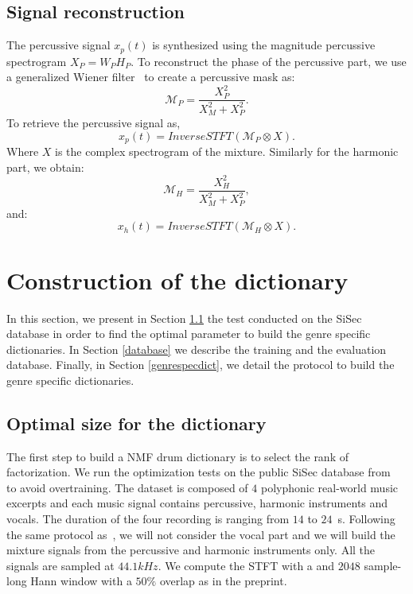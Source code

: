 \documentclass{article}
\begin{document}
 
\subsection{Signal reconstruction}

The percussive signal $x_p(t)$ is synthesized using the magnitude percussive spectrogram $X_P = W_PH_P$. To reconstruct the phase of the percussive part, we use a generalized Wiener filter~\cite{liutkus2015generalized} to create a percussive mask as:
\begin{equation}
\mathcal{M}_P = \frac{X_P^2}{X_M^2 + X_P^2}.
\end{equation} 
To retrieve the percussive signal as, 
\begin{equation}
x_p(t) = InverseSTFT(\mathcal{M}_P \otimes X).
\end{equation}
Where $X$ is the complex spectrogram of the mixture.
Similarly for the harmonic part, we obtain:
\begin{equation}\label{percuweiner}
\mathcal{M}_H = \frac{X_H^2}{X_M^2 + X_P^2},
\end{equation}
and:
\begin{equation}
x_h(t) = InverseSTFT(\mathcal{M}_H \otimes X).
\end{equation}




\section{Construction of the dictionary}

In this section, we present in Section \ref{optimalsize} the test conducted on the SiSec database in order to find the optimal parameter to build the genre specific dictionaries. In Section \ref{database} we describe the training and the evaluation database. Finally, in Section \ref{genrespecdict}, we detail the protocol to build the genre specific dictionaries. 

\subsection{Optimal size for the dictionary}\label{optimalsize}

The first step to build a NMF drum dictionary is to select the rank of factorization. We run the optimization tests on the public SiSec database from~\cite{SiSec10} to avoid overtraining. The dataset is composed of $4$ polyphonic real-world music excerpts and each music signal contains percussive, harmonic instruments and vocals. The duration of the four recording is ranging from $14$ to $24$~s. Following the same protocol as~\cite{canadas2014percussive}, we will not consider the vocal part and we will build the mixture signals from the percussive and harmonic instruments only. All the signals are sampled at $44.1kHz$. We compute the STFT with a and $2048$ sample-long Hann window with a $50\%$ overlap as in the preprint.
\end{document}

